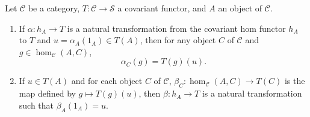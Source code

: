 Let $\mathcal{C}$ be a category, $T : \mathcal{C} \to \mathcal{S}$ a covariant functor, and $A$ an object of $\mathcal{C}$.
\begin{enumerate}
\item[(i)] If $\alpha : h_A \to T$ is a natural transformation from the covariant hom functor $h_A$ to $T$ and $u = \alpha_A(1_A) \in T(A)$, then for any object $C$ of $\mathcal{C}$ and $g \in \hom_{\mathcal{C}}(A,C)$,
\[
\alpha_C(g) = T(g)(u).
\]
\item[(ii)] If $u \in T(A)$ and for each object $C$ of $\mathcal{C}$, $\beta_C : \hom_{\mathcal{C}}(A,C) \to T(C)$ is the map defined by $g \mapsto T(g)(u)$, then $\beta : h_A \to T$ is a natural transformation such that $\beta_A(1_A) = u$.
\end{enumerate}

